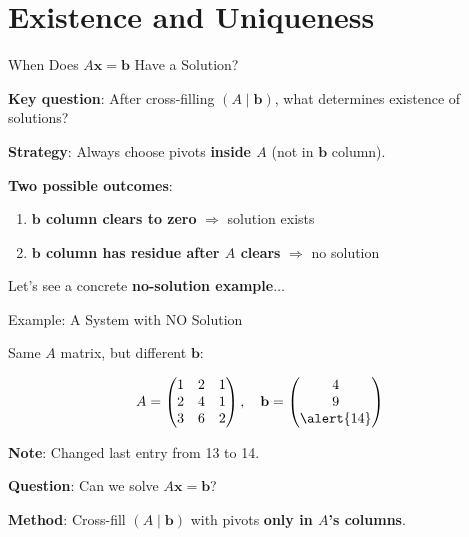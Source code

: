 \documentclass[10pt]{beamer}
\theoremstyle{definition}
\newcommand{\x}[1]{\alert{\textbf{#1}}}
\begin{document}
\section{Existence and Uniqueness}

\begin{frame}{When Does $A\mathbf{x} = \mathbf{b}$ Have a Solution?}

\x{Key question}: After cross-filling $(A \mid \mathbf{b})$, what determines existence of solutions?

\vspace{1em}

\x{Strategy}: Always choose pivots \textbf{inside $A$} (not in $\mathbf{b}$ column).

\vspace{1em}

\x{Two possible outcomes}:
\begin{enumerate}
\item \textbf{$\mathbf{b}$ column clears to zero} $\Rightarrow$ solution exists
\item \textbf{$\mathbf{b}$ column has residue after $A$ clears} $\Rightarrow$ no solution
\end{enumerate}

\vspace{1em}

Let's see a concrete \x{no-solution example}$\ldots$

\end{frame}

\begin{frame}{Example: A System with NO Solution}

Same $A$ matrix, but \alert{different $\mathbf{b}$}:

$$A = \begin{pmatrix}
1 & 2 & 1 \\
2 & 4 & 1 \\
3 & 6 & 2
\end{pmatrix}, \quad \mathbf{b} = \begin{pmatrix} 4 \\ 9 \\ \alert{14} \end{pmatrix}$$

\vspace{0.5em}

\x{Note}: Changed last entry from 13 to \alert{14}.

\vspace{1em}

\x{Question}: Can we solve $A\mathbf{x} = \mathbf{b}$?

\vspace{0.5em}

\x{Method}: Cross-fill $(A \mid \mathbf{b})$ with pivots \textbf{only in $A$'s columns}.

\end{frame}
\end{document}
